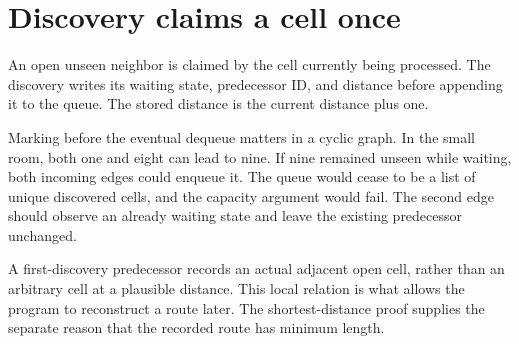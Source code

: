 \section{Discovery claims a cell once}\label{maze-p07}

An open unseen neighbor is claimed by the cell currently being processed. The discovery writes its waiting state, predecessor ID, and distance before appending it to the queue. The stored distance is the current distance plus one.

Marking before the eventual dequeue matters in a cyclic graph. In the small room, both one and eight can lead to nine. If nine remained unseen while waiting, both incoming edges could enqueue it. The queue would cease to be a list of unique discovered cells, and the capacity argument would fail. The second edge should observe an already waiting state and leave the existing predecessor unchanged.

A first-discovery predecessor records an actual adjacent open cell, rather than an arbitrary cell at a plausible distance. This local relation is what allows the program to reconstruct a route later. The shortest-distance proof supplies the separate reason that the recorded route has minimum length.
